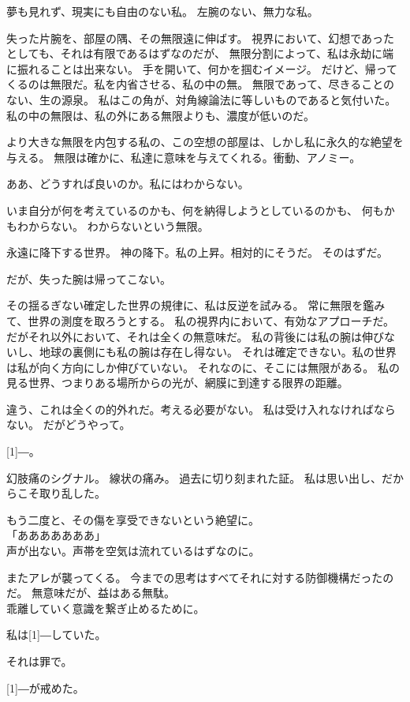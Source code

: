 \documentclass[../IHMain]{subfiles}
\begin{document}
夢も見れず、現実にも自由のない私。
左腕のない、無力な私。

失った片腕を、部屋の隅、その無限遠に伸ばす。
視界において、幻想であったとしても、それは有限であるはずなのだが、
無限分割によって、私は永劫に端に振れることは出来ない。
手を開いて、何かを掴むイメージ。
だけど、帰ってくるのは無限だ。私を内省させる、私の中の無。
無限であって、尽きることのない、生の源泉。
私はこの角が、対角線論法に等しいものであると気付いた。
私の中の無限は、私の外にある無限よりも、濃度が低いのだ。

より大きな無限を内包する私の、この空想の部屋は、しかし私に永久的な絶望を与える。
無限は確かに、私達に意味を与えてくれる。衝動、アノミー。

ああ、どうすれば良いのか。私にはわからない。

いま自分が何を考えているのかも、何を納得しようとしているのかも、
何もかもわからない。
わからないという無限。

永遠に降下する世界。
神の降下。私の上昇。相対的にそうだ。
そのはずだ。

だが、失った腕は帰ってこない。

その揺るぎない確定した世界の規律に、私は反逆を試みる。
常に無限を鑑みて、世界の測度を取ろうとする。
私の視界内において、有効なアプローチだ。
だがそれ以外において、それは全くの無意味だ。
私の背後には私の腕は伸びないし、地球の裏側にも私の腕は存在し得ない。
それは確定できない。私の世界は私が向く方向にしか伸びていない。
それなのに、そこには無限がある。
私の見る世界、つまりある場所からの光が、網膜に到達する限界の距離。

違う、これは全くの的外れだ。考える必要がない。
私は受け入れなければならない。
だがどうやって。

\scalebox{3}[1]{―}。

幻肢痛のシグナル。
線状の痛み。
過去に切り刻まれた証。
私は思い出し、だからこそ取り乱した。

もう二度と、その傷を享受できないという絶望に。\\
「あああああああ」\\
声が出ない。声帯を空気は流れているはずなのに。

またアレが襲ってくる。
今までの思考はすべてそれに対する防御機構だったのだ。
無意味だが、益はある無駄。\\

乖離していく意識を繋ぎ止めるために。

私は\scalebox{3}[1]{―}していた。

それは罪で。

\scalebox{3}[1]{―}が戒めた。
\end{document}

